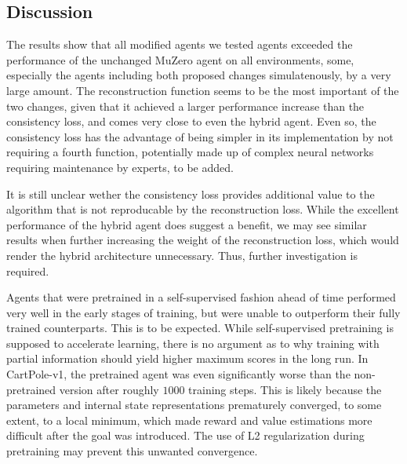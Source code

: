 \subsection{Discussion}
The results show that all modified agents we tested agents exceeded the performance of the unchanged MuZero agent on all environments, some, especially the agents including both proposed changes simulatenously, by a very large amount. The reconstruction function seems to be the most important of the two changes, given that it achieved a larger performance increase than the consistency loss, and comes very close to even the hybrid agent. Even so, the consistency loss has the advantage of being simpler in its implementation by not requiring a fourth function, potentially made up of complex neural networks requiring maintenance by experts, to be added.

It is still unclear wether the consistency loss provides additional value to the algorithm that is not reproducable by the reconstruction loss. While the excellent performance of the hybrid agent does suggest a benefit, we may see similar results when further increasing the weight of the reconstruction loss, which would render the hybrid architecture unnecessary. Thus, further investigation is required.

Agents that were pretrained in a self-supervised fashion ahead of time performed very well in the early stages of training, but were unable to outperform their fully trained counterparts. This is to be expected. While self-supervised pretraining is supposed to accelerate learning, there is no argument as to why training with partial information should yield higher maximum scores in the long run. In CartPole-v1, the pretrained agent was even significantly worse than the non-pretrained version after roughly $1000$ training steps. This is likely because the parameters and internal state representations prematurely converged, to some extent, to a local minimum, which made reward and value estimations more difficult after the goal was introduced. The use of L2 regularization during pretraining may prevent this unwanted convergence.